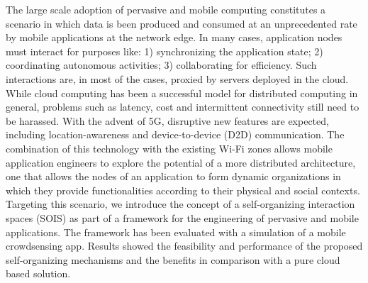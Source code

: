 The large scale adoption of pervasive and mobile computing constitutes a scenario in which data is been produced and consumed at an unprecedented rate by mobile applications at the network edge. In many cases, application nodes must interact for purposes like: 1) synchronizing the application state; 2) coordinating autonomous activities; 3) collaborating for efficiency. 
Such interactions are, in most of the cases, proxied by servers deployed in the cloud. While cloud computing has been a successful model for distributed computing in general, problems such as latency, cost and intermittent connectivity still need to be harassed. With the advent of 5G, disruptive new features are expected, including location-awareness and device-to-device (D2D) communication. The combination of this technology with the existing Wi-Fi zones allows mobile application engineers to explore the potential of a more distributed architecture, one that allows the nodes of an application 
to form dynamic organizations in which they provide functionalities according to their physical and social contexts. Targeting this scenario, we introduce the concept of a self-organizing interaction spaces (SOIS) as part of a framework for the engineering of pervasive and mobile applications. The framework has been evaluated with a simulation of a mobile crowdsensing app. Results showed the feasibility and performance of the proposed self-organizing mechanisms and the benefits in comparison with a pure cloud based solution.




